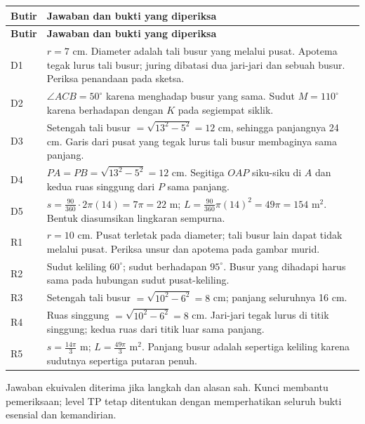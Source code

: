 \documentclass[11pt,a4paper]{article}
\begin{document}
{\small\setlength{\tabcolsep}{2mm}\renewcommand{\arraystretch}{1.35}\begin{longtable}{|>{\raggedright\arraybackslash}p{14.685mm}|>{\raggedright\arraybackslash}p{154.865mm}|}\hline
\rowcolor{gray!10}\textbf{Butir} & \textbf{Jawaban dan bukti yang diperiksa}\\ \hline
\endfirsthead
\rowcolor{gray!10}\textbf{Butir} & \textbf{Jawaban dan bukti yang diperiksa}\\ \hline
\endhead
D1 & \(r=7\) cm. Diameter adalah tali busur yang melalui pusat. Apotema tegak lurus tali busur; juring dibatasi dua jari-jari dan sebuah busur. Periksa penandaan pada sketsa.\\ \hline
D2 & \(\angle ACB=50^\circ\) karena menghadap busur yang sama. Sudut \(M=110^\circ\) karena berhadapan dengan \(K\) pada segiempat siklik.\\ \hline
D3 & Setengah tali busur \(=\sqrt{13^2-5^2}=12\) cm, sehingga panjangnya 24 cm. Garis dari pusat yang tegak lurus tali busur membaginya sama panjang.\\ \hline
D4 & \(PA=PB=\sqrt{13^2-5^2}=12\) cm. Segitiga \(OAP\) siku-siku di \(A\) dan kedua ruas singgung dari \(P\) sama panjang.\\ \hline
D5 & \(s=\frac{90}{360}\cdot2\pi(14)=7\pi=22\) m; \(L=\frac{90}{360}\pi(14)^2=49\pi=154\) m\(^2\). Bentuk diasumsikan lingkaran sempurna.\\ \hline
R1 & \(r=10\) cm. Pusat terletak pada diameter; tali busur lain dapat tidak melalui pusat. Periksa unsur dan apotema pada gambar murid.\\ \hline
R2 & Sudut keliling \(60^\circ\); sudut berhadapan \(95^\circ\). Busur yang dihadapi harus sama pada hubungan sudut pusat-keliling.\\ \hline
R3 & Setengah tali busur \(=\sqrt{10^2-6^2}=8\) cm; panjang seluruhnya 16 cm.\\ \hline
R4 & Ruas singgung \(=\sqrt{10^2-6^2}=8\) cm. Jari-jari tegak lurus di titik singgung; kedua ruas dari titik luar sama panjang.\\ \hline
R5 & \(s=\frac{14\pi}{3}\) m; \(L=\frac{49\pi}{3}\) m\(^2\). Panjang busur adalah sepertiga keliling karena sudutnya sepertiga putaran penuh.\\ \hline
\end{longtable}}\medskip
{\small Jawaban ekuivalen diterima jika langkah dan alasan sah. Kunci membantu pemeriksaan; level TP tetap ditentukan dengan memperhatikan seluruh bukti esensial dan kemandirian.\par}\medskip
\end{document}
